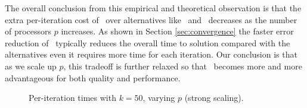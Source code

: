 The overall conclusion from this empirical and theoretical observation is that the extra per-iteration cost of \BPP\ over alternatives like \MU\ and \HALS\ decreases as the number of processors $p$ increases.
As shown in Section \ref{sec:convergence} the faster error reduction of \BPP\ typically reduces the overall time to solution compared with the alternatives even it requires more time for each iteration.
Our conclusion is that as we scale up $p$, this tradeoff is further relaxed so that \BPP\ becomes more and more advantageous for both quality and performance.


\begin{figure}

\naivetrue
\ksweepfalse
\legendtrue

\begin{subfigure}{\columnwidth}
{}
\label{fig:sparsesynstrongscale}
\end{subfigure}
\legendfalse

\begin{subfigure}{\columnwidth}
{}
\label{fig:densesynscaling}
\end{subfigure}


\begin{subfigure}{\columnwidth}
\renewcommand{\datafile}{data/sparserwstrong_scale_pgf.dat}
\label{fig:sparserwscaling}
\end{subfigure}

\begin{subfigure}{\columnwidth}
\renewcommand{\datafile}{data/denserwstrong_scale_pgf.dat}
\label{fig:denserwscaling}
\end{subfigure}

\caption{Per-iteration times with $k=50$, varying $p$ (strong scaling).}
\label{fig:scaling}
\end{figure}


